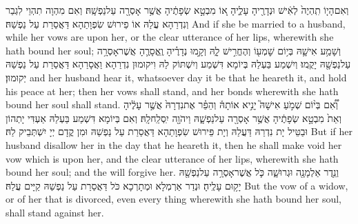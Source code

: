 {וְאִם\maqqaf הָי֤וֹ תִֽהְיֶה֙ לְאִ֔ישׁ וּנְדָרֶ֖יהָ עָלֶ֑יהָ א֚וֹ מִבְטָ֣א שְׂפָתֶ֔יהָ אֲשֶׁ֥ר אָסְרָ֖ה עַל\maqqaf נַפְשָֽׁהּ׃}
{וְאִם מִהְוָה תִהְוֵי לִגְבַר וְנִדְרַהָא עֲלַהּ אוֹ פֵירוּשׁ שִׂפְוָתַהָא דַּאֲסַרַת עַל נַפְשַׁהּ׃}
{And if she be married to a husband, while her vows are upon her, or the clear utterance of her lips, wherewith she hath bound her soul;}{}
{וְשָׁמַ֥ע אִישָׁ֛הּ בְּי֥וֹם שׇׁמְע֖וֹ וְהֶחֱרִ֣ישׁ לָ֑הּ וְקָ֣מוּ נְדָרֶ֗יהָ וֶֽאֱסָרֶ֛הָ אֲשֶׁר\maqqaf אָסְרָ֥ה עַל\maqqaf נַפְשָׁ֖הּ יָקֻֽמוּ׃}
{וְיִשְׁמַע בַּעְלַהּ בְּיוֹמָא דִּשְׁמַע וְיִשְׁתּוֹק לַהּ וִיקוּמוּן נִדְרַהָא וַאֲסָרַהָא דַּאֲסַרַת עַל נַפְשַׁהּ יְקוּמוּן׃}
{and her husband hear it, whatsoever day it be that he heareth it, and hold his peace at her; then her vows shall stand, and her bonds wherewith she hath bound her soul shall stand.}{}
{וְ֠אִ֠ם בְּי֨וֹם שְׁמֹ֣עַ אִישָׁהּ֮ יָנִ֣יא אוֹתָהּ֒ וְהֵפֵ֗ר אֶת\maqqaf נִדְרָהּ֙ אֲשֶׁ֣ר עָלֶ֔יהָ וְאֵת֙ מִבְטָ֣א שְׂפָתֶ֔יהָ אֲשֶׁ֥ר אָסְרָ֖ה עַל\maqqaf נַפְשָׁ֑הּ וַיהֹוָ֖ה יִֽסְלַֽח\maqqaf לָֽהּ׃}
{וְאִם בְּיוֹמָא דִּשְׁמַע בַּעְלַהּ אַעְדִּי יָתְהוֹן וּבַטֵּיל יָת נִדְרַהּ דַּעֲלַהּ וְיָת פֵּירוּשׁ שִׂפְוָתַהָא דַּאֲסַרַת עַל נַפְשַׁהּ וּמִן קֳדָם יְיָ יִשְׁתְּבֵיק לַהּ׃}
{But if her husband disallow her in the day that he heareth it, then he shall make void her vow which is upon her, and the clear utterance of her lips, wherewith she hath bound her soul; and the \lord\space will forgive her.}{}
{וְנֵ֥דֶר אַלְמָנָ֖ה וּגְרוּשָׁ֑ה כֹּ֛ל אֲשֶׁר\maqqaf אָסְרָ֥ה עַל\maqqaf נַפְשָׁ֖הּ יָק֥וּם עָלֶֽיהָ׃}
{וּנְדַר אַרְמְלָא וּמְתָרְכָא כֹּל דַּאֲסַרַת עַל נַפְשַׁהּ קַיָּים עֲלַהּ׃}
{But the vow of a widow, or of her that is divorced, even every thing wherewith she hath bound her soul, shall stand against her.}{}
